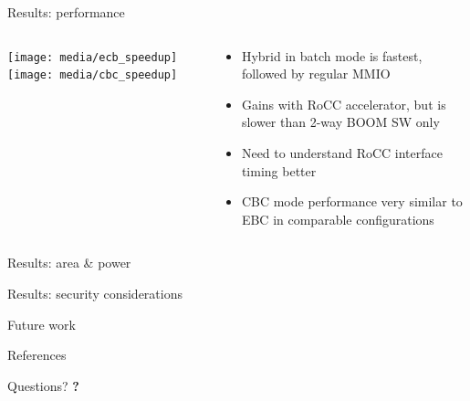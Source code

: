 \documentclass[dvipsnames]{beamer}
\begin{document}
\begin{frame}{Results: performance}
  \begin{columns}[T]
  \begin{column}{0.5\textwidth}
  \texttt{[image: media/ecb\_speedup]}
  \texttt{[image: media/cbc\_speedup]}
  \end{column}
  \begin{column}{0.5\textwidth}
  \begin{itemize}
    \item Hybrid in batch mode is fastest, followed by regular MMIO
    \item Gains with RoCC accelerator, but is slower than 2-way BOOM SW only
    \item Need to understand RoCC interface timing better
    \item CBC mode performance very similar to EBC in comparable configurations
  \end{itemize}
  \end{column}
  \end{columns}
\end{frame}

\begin{frame}{Results: area \& power}
\end{frame}

\begin{frame}{Results: security considerations}
\end{frame}

\begin{frame}{Future work}
\end{frame}

\begin{frame}{References}
\end{frame}

\begin{frame}{Questions?}
  \centering
  \huge\bfseries ?
\end{frame}
\end{document}
